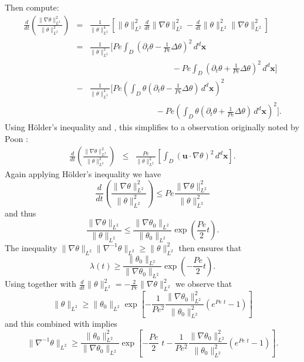 \documentclass[12pt]{iopart}
\newcommand{\ddt}[1]{\frac{d #1}{dt}}
\newcommand{\hmone}[1]{\|\nabla^{-1} #1\|_{L^{2}}}
\newcommand{\ltwo}[1]{\|#1\|_{L^{2}}}
\newcommand{\hone}[1]{\| \nabla #1\|_{L^{2}}}
\newcommand{\sint}[1]{\int_{D} #1 \, d^{d}\mathbf{x}}
\renewcommand{\vec}[1]{\mathbf{#1}}
\newcommand{\ppt}[1]{\partial_{t} #1}
\newcommand{\lap}{\Delta }
\newcommand{\pbrac}[1]{\left( #1 \right)}
\newcommand{\sbrac}[1]{\left[ #1 \right]}
\begin{document}
Then compute:
%
\begin{eqnarray*}
	\ddt{} \pbrac{ \frac{\hone{\theta}^2}{\ltwo{\theta}^2} } 
			&=& \frac{1}{\ltwo{\theta}^4}
			\sbrac{
				\ltwo{\theta}^2\ddt{}\hone{\theta}^2
				-\ddt{}\ltwo{\theta}^2\hone{\theta}^2			
			}\\
			&=& \frac{1}{\ltwo{\theta}^2}
			 \Bigg[ Pe \sint{\left(\ppt{\theta} -\frac{1}{Pe}\lap \theta\right)^2}  \\
 				& & \qquad\qquad\qquad \qquad \qquad 
				-Pe\sint{\left(\ppt{\theta}+\frac{1}{Pe}\lap \theta\right)^2} 
			\Bigg]\\
		        &-&\frac{1}{\ltwo{\theta}^4}
			\Bigg[ 
				Pe \pbrac{\sint{\theta\left(\ppt{\theta}-\frac{1}{Pe}\lap \theta\right)} }^2\\
 				& & \qquad\qquad\qquad \qquad
				-Pe\pbrac{
					 \sint{\theta\left(\ppt{\theta}
	 									+\frac{1}{Pe}\lap \theta\right)} 
 				}^2					
			\Bigg].
\end{eqnarray*}
%
Using H\"older's inequality and , this simplifies to a observation originally noted by Poon \cite{Chi-Cheu1996}:
%
\begin{eqnarray}
	\ddt{} \pbrac{ \frac{\hone{\theta}^2}{\ltwo{\theta}^2} } 
			&\leq & \frac{Pe}{\ltwo{\theta}^2}
			\sbrac{
					 \sint{(\vec{u}\cdot \nabla \theta)^2} 
			}.
\end{eqnarray}
Again applying H\"older's inequality we have
\begin{equation}
\label{eq:k2growth_energy}
	\ddt{} 
		\pbrac{ 
			\frac{\hone{\theta}^2}{\ltwo{\theta}^2} 
		} 
		\leq  
		Pe
		\frac{\hone{\theta}^2}{\ltwo{\theta}^2} 
\end{equation}
%
and thus 
%
\begin{equation*}
		\frac{\hone{\theta}}{\ltwo{\theta}} 
		\leq  
		\frac{\hone{\theta_0}}{\ltwo{\theta_0}}
		\exp{\pbrac{\frac{Pe}{2} t}}.
\end{equation*}
%
The inequality $\hone{\theta}\hmone{\theta}\geq \ltwo{\theta}^2$ then ensures that
%
\begin{equation}
\label{eq:lambda_bound}
\lambda(t) \geq \frac{\ltwo{\theta_0}}{\hone{\theta_0}}\exp{\pbrac{-\frac{Pe}{2}t}}.
\end{equation}
%
Using  together with  $\ddt{}\ltwo{\theta}^2 = -\frac{2}{Pe} \hone{\theta}^2$ we observe that
%
\begin{equation*}
\ltwo{\theta}\geq \ltwo{\theta_{0}}\exp\left[-\frac{1}{Pe^2}\frac{\hone{\theta_0}^2}{\ltwo{\theta_0}^2}\left(e^{Pe \, \, t}-1\right)\right]
\end{equation*}
%
and this combined with   implies
%
\begin{equation}
\hmone{\theta}\geq \frac{\ltwo{\theta_{0}}^2}{\hone{\theta_0}}\exp\left[-\frac{Pe}{2} \,\, t-\frac{1}{Pe^2}\frac{\hone{\theta_0}^2}{\ltwo{\theta_0}^2}\left(e^{Pe \,\, t}-1\right)\right].
\end{equation}
\end{document}
